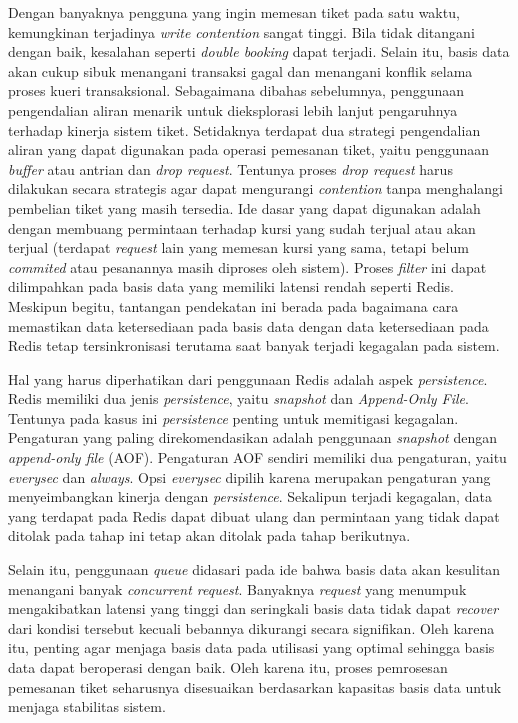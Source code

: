 Dengan banyaknya pengguna yang ingin memesan tiket pada satu waktu, kemungkinan terjadinya \textit{write contention} sangat tinggi. Bila tidak ditangani dengan baik, kesalahan seperti \textit{double booking} dapat terjadi. Selain itu, basis data akan cukup sibuk menangani transaksi gagal dan menangani konflik selama proses kueri transaksional. Sebagaimana dibahas sebelumnya, penggunaan pengendalian aliran menarik untuk dieksplorasi lebih lanjut pengaruhnya terhadap kinerja sistem tiket. Setidaknya terdapat dua strategi pengendalian aliran yang dapat digunakan pada operasi pemesanan tiket, yaitu penggunaan \textit{buffer} atau antrian dan \textit{drop request}. Tentunya proses \textit{drop request} harus dilakukan secara strategis agar dapat mengurangi \textit{contention} tanpa menghalangi pembelian tiket yang masih tersedia. Ide dasar yang dapat digunakan adalah dengan membuang permintaan terhadap kursi yang sudah terjual atau akan terjual (terdapat \textit{request} lain yang memesan kursi yang sama, tetapi belum \textit{commited} atau pesanannya masih diproses oleh sistem). Proses \textit{filter} ini dapat dilimpahkan pada basis data yang memiliki latensi rendah seperti Redis. Meskipun begitu, tantangan pendekatan ini berada pada bagaimana cara memastikan data ketersediaan pada basis data dengan data ketersediaan pada Redis tetap tersinkronisasi terutama saat banyak terjadi kegagalan pada sistem.

Hal yang harus diperhatikan dari penggunaan Redis adalah aspek \textit{persistence}. Redis memiliki dua jenis \textit{persistence}, yaitu \textit{snapshot} dan \textit{Append-Only File}. Tentunya pada kasus ini \textit{persistence} penting untuk memitigasi kegagalan. Pengaturan yang paling direkomendasikan adalah penggunaan \textit{snapshot} dengan \textit{append-only file} (AOF). Pengaturan AOF sendiri memiliki dua pengaturan, yaitu \textit{everysec} dan \textit{always}. Opsi \textit{everysec} dipilih karena merupakan pengaturan yang menyeimbangkan kinerja dengan \textit{persistence}. Sekalipun terjadi kegagalan, data yang terdapat pada Redis dapat dibuat ulang dan permintaan yang tidak dapat ditolak pada tahap ini tetap akan ditolak pada tahap berikutnya.

Selain itu, penggunaan \textit{queue} didasari pada ide bahwa basis data akan kesulitan menangani banyak \textit{concurrent request}. Banyaknya \textit{request} yang menumpuk mengakibatkan latensi yang tinggi dan seringkali basis data tidak dapat \textit{recover} dari kondisi tersebut kecuali bebannya dikurangi secara signifikan. Oleh karena itu, penting agar menjaga basis data pada utilisasi yang optimal sehingga basis data dapat beroperasi dengan baik. Oleh karena itu, proses pemrosesan pemesanan tiket seharusnya disesuaikan berdasarkan kapasitas basis data untuk menjaga stabilitas sistem.

